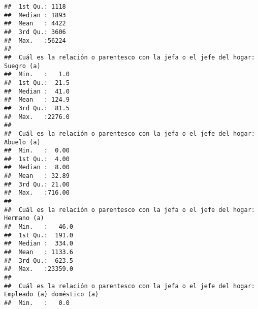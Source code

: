\documentclass[11pt,]{article}
\begin{document}
\begin{verbatim}
##  1st Qu.: 1118                                                              
##  Median : 1893                                                              
##  Mean   : 4422                                                              
##  3rd Qu.: 3606                                                              
##  Max.   :56224                                                              
##                                                                             
##  Cuál es la relación o parentesco con la jefa o el jefe del hogar: Suegro (a)
##  Min.   :   1.0                                                              
##  1st Qu.:  21.5                                                              
##  Median :  41.0                                                              
##  Mean   : 124.9                                                              
##  3rd Qu.:  81.5                                                              
##  Max.   :2276.0                                                              
##                                                                              
##  Cuál es la relación o parentesco con la jefa o el jefe del hogar: Abuelo (a)
##  Min.   :  0.00                                                              
##  1st Qu.:  4.00                                                              
##  Median :  8.00                                                              
##  Mean   : 32.89                                                              
##  3rd Qu.: 21.00                                                              
##  Max.   :716.00                                                              
##                                                                              
##  Cuál es la relación o parentesco con la jefa o el jefe del hogar: Hermano (a)
##  Min.   :   46.0                                                              
##  1st Qu.:  191.0                                                              
##  Median :  334.0                                                              
##  Mean   : 1133.6                                                              
##  3rd Qu.:  623.5                                                              
##  Max.   :23359.0                                                              
##                                                                               
##  Cuál es la relación o parentesco con la jefa o el jefe del hogar: Empleado (a) doméstico (a)
##  Min.   :   0.0                                                                              

\end{verbatim}
\end{document}
